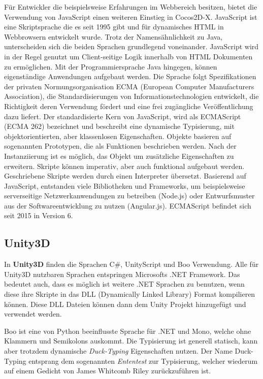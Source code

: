 \bigskip
Für Entwickler die beispielsweise Erfahrungen im Webbereich besitzen, bietet die Verwendung von JavaScript einen weiteren Einstieg in Cocos2D-X.
JavaScript ist eine Skriptsprache die es seit 1995 gibt und für dynamisches HTML in Webbrowsern entwickelt wurde. Trotz der Namensähnlichkeit zu Java, unterscheiden sich die beiden Sprachen grundlegend voneinander. JavaScript wird in der Regel genutzt um Client-seitige Logik innerhalb von HTML Dokumenten zu ermöglichen. Mit der Programmiersprache Java hingegen, können eigenständige Anwendungen aufgebaut werden. Die Sprache folgt Spezifikationen der privaten Normungsorganisation ECMA (European Computer Manufacturers Association), die Standardisierungen von Informationstechnologien entwickelt, die Richtigkeit deren Verwendung fördert und eine frei zugängliche Veröffentlichung dazu liefert. Der standardisierte Kern von JavaScript, wird als ECMAScript (ECMA 262) bezeichnet und beschreibt eine dynamische Typisierung, mit objektorientierten, aber klassenlosen Eigenschaften. Objekte basieren auf sogenannten Prototypen, die als Funktionen beschrieben werden. Nach der Instanziierung ist es möglich, das Objekt um zusätzliche Eigenschaften zu erweitern. Skripte können imperativ, aber auch funktional aufgebaut werden. Geschriebene Skripte werden durch einen Interpreter übersetzt. Basierend auf JavaScript, entstanden viele Bibliotheken und Frameworks, um beispielsweise serverseitige Netzwerkanwendungen zu betreiben (Node.js) oder Entwurfsmuster aus der Softwareentwicklung zu nutzen (Angular.js).
ECMAScript befindet sich seit 2015 in Version 6. \citep{learning_javascript}

\subsection{Unity3D}
In \textbf{Unity3D} finden die Sprachen C\#, UnityScript und Boo Verwendung. Alle für Unity3D nutzbaren Sprachen entspringen Microsofts .NET Framework. Das bedeutet auch, dass es möglich ist weitere .NET Sprachen zu benutzen, wenn diese ihre Skripte in das DLL (Dynamically Linked Library) Format kompilieren können. Diese DLL Dateien können dann dem Unity Projekt hinzugefügt und verwendet werden. \citep{unity_managed_plugins}

\bigskip
Boo ist eine von Python beeinflusste Sprache für .NET und Mono, welche ohne Klammern und Semikolons auskommt. Die Typisierung ist generell statisch, kann aber trotzdem dynamische \textit{Duck-Typing} Eigenschaften nutzen. \citep{boo_about} Der Name Duck-Typing entsprang dem sogenannten \textit{Ententest} zur Typisierung, welcher wiederum auf einem Gedicht von James Whitcomb Riley zurückzuführen ist.

